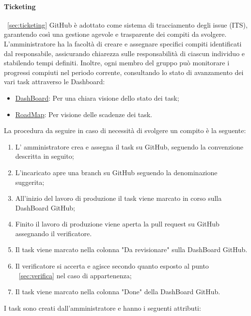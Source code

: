 \documentclass{article}
\begin{document}
\paragraph{Ticketing} ~\ref{sec:ticketing}
GitHub è adottato come sistema di tracciamento degli issue (ITS), garantendo così una gestione agevole e trasparente dei compiti da svolgere. L'amministratore ha la facoltà di creare e assegnare specifici compiti identificati dal responsabile, assicurando chiarezza sulle responsabilità di ciascun individuo e stabilendo tempi definiti. Inoltre, ogni membro del gruppo può monitorare i progressi compiuti nel periodo corrente, consultando lo stato di avanzamento dei vari task attraverso le Dashboard:
\begin{itemize}
    \item \href{https://github.com/orgs/ByteOps-swe/projects/1}{DashBoard}: Per una chiara visione dello stato dei task;
    \item \href{https://github.com/orgs/ByteOps-swe/projects/3}{RoadMap}: Per visione delle scadenze dei task.
\end{itemize}
La procedura da seguire in caso di necessità di svolgere un compito è la seguente:
\begin{enumerate}
    \item L' amministratore crea e assegna il task su GitHub, seguendo la convenzione descritta in seguito;
    \item L'incaricato apre una branch su GitHub seguendo la denominazione suggerita;
    \item  All'inizio del lavoro di produzione il task viene marcato in corso sulla DashBoard GitHub;
    \item Finito il lavoro di produzione viene aperta la pull request su GitHub assegnando il verificatore.
    \item Il task viene marcato nella colonna "Da revisionare" sulla DashBoard GitHub.
    \item Il verificatore si accerta e agisce secondo quanto esposto al punto ~\ref{sec:verifica} nel caso di appartenenza;
    \item Il task viene marcato nella colonna "Done" della DashBoard GitHub.
\end{enumerate}
I task sono creati dall'amministratore e hanno i seguenti attributi:
\end{document}
